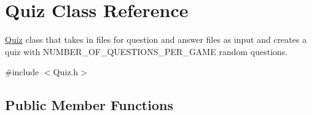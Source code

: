 \hypertarget{class_quiz}{}\section{Quiz Class Reference}
\label{class_quiz}


\mbox{\hyperlink{class_quiz}{Quiz}} class that takes in files for question and answer files as input and creates a quiz with N\+U\+M\+B\+E\+R\+\_\+\+O\+F\+\_\+\+Q\+U\+E\+S\+T\+I\+O\+N\+S\+\_\+\+P\+E\+R\+\_\+\+G\+A\+ME random questions.  




{\ttfamily \#include $<$Quiz.\+h$>$}

\subsection*{Public Member Functions}
